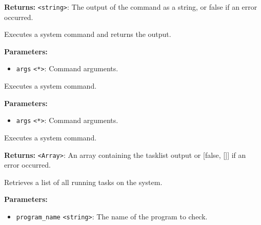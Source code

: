 \documentclass[12pt,a4paper]{article}
\begin{document}
\noindent \textbf{Returns:} \texttt{<string>}: The output of the command as a string, or false if an error occurred.

\noindent Executes a system command and returns the output.

\vspace{5mm}
\noindent {}


\noindent \textbf{Parameters:}
\begin{itemize}
  \item \texttt{args} \texttt{<*>}: Command arguments.
\end{itemize}

\noindent Executes a system command.

\vspace{5mm}
\noindent {}


\noindent \textbf{Parameters:}
\begin{itemize}
  \item \texttt{args} \texttt{<*>}: Command arguments.
\end{itemize}

\noindent Executes a system command.

\vspace{5mm}
\noindent {}


\noindent \textbf{Returns:} \texttt{<Array>}: An array containing the tasklist output or [false, []] if an error occurred.

\noindent Retrieves a list of all running tasks on the system.

\vspace{5mm}
\noindent {}


\noindent \textbf{Parameters:}
\begin{itemize}
  \item \texttt{program\_name} \texttt{<string>}: The name of the program to check.
\end{itemize}
\end{document}
